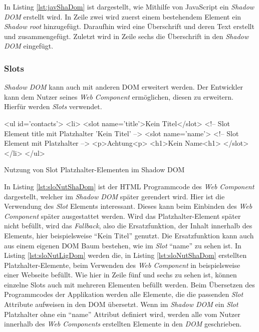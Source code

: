 \documentclass[12pt, paper=a4, bibtotoc, toc=listof, headsepline=true]{scrreprt}
\begin{document}
		In Listing \ref{lst:javShaDom} ist dargestellt, wie Mithilfe von JavaScript ein \emph{Shadow \ac{DOM}} erstellt wird. In Zeile zwei wird zuerst einem bestehendem Element ein \emph{Shadow root} hinzugefügt. Daraufhin wird eine Überschrift und deren Text erstellt und zusammengefügt. Zuletzt wird in Zeile sechs die Überschrift in den \emph{Shadow \ac{DOM}} eingefügt.
			\subsubsection{Slots}
			\emph{Shadow \ac{DOM}} kann auch mit anderen \ac{DOM} erweitert werden. Der Entwickler kann dem Nutzer seines \emph{Web Component} ermöglichen, diesen zu erweitern. Hierfür werden \emph{Slots} verwendet. 
			\begin{listing}
				\begin{HTMLcode*}{}
<ul id='contacts'>
   <li>
      <slot name='title'>Kein Titel</slot> <!-- Slot Element title mit Platzhalter 'Kein Titel' -->
      <slot name='name'> <!-- Slot Element mit Platzhalter -->
         <p>Achtung<p>
         <h1>Kein Name<h1>
      </slot>
   </li>
</ul>
				\end{HTMLcode*}
				\caption[Slot Elemente im Shadow DOM]{Nutzung von Slot Platzhalter-Elementen im Shadow DOM}
				\label{lst:sloNutShaDom}
			\end{listing}
			In Listing \ref{lst:sloNutShaDom} ist der \ac{HTML} Programmcode des \emph{Web Component} dargestellt, welcher im \emph{Shadow \ac{DOM}} später gerendert wird. Hier ist die Verwendung des \emph{Slot} Elements interessant. Dieses kann beim Einbinden des \emph{Web Component} später ausgestattet werden. Wird das Platzhalter-Element später nicht befüllt, wird das \emph{Fallback}, also die Ersatzfunktion, der Inhalt innerhalb des Elements, hier beispielsweise \enquote{Kein Titel} genutzt. Die Ersatzfunktion kann auch aus einem eigenen \ac{DOM} Baum bestehen, wie im \emph{Slot} \enquote{name} zu sehen ist\cite{Bidelman2016}. In Listing \ref{lst:sloNutLigDom} werden die, in Listing \ref{lst:sloNutShaDom} erstellten Platzhalter-Elemente, beim Verwenden des \emph{Web Component} in beispielsweise einer Webseite befüllt. Wie hier in Zeile fünf und sechs zu sehen ist, können einzelne Slots auch mit mehreren Elementen befüllt werden. Beim Übersetzen des Programmcodes der Applikation werden alle Elemente, die die passenden \emph{Slot} Attribute aufweisen in den \ac{DOM} übersetzt. Wenn im \emph{Shadow \ac{DOM}} ein \emph{Slot} Platzhalter ohne ein \enquote{name} Attribut definiert wird, werden alle vom Nutzer innerhalb des \emph{Web Components} erstellten Elemente in den \emph{DOM} geschrieben.
\end{document}
